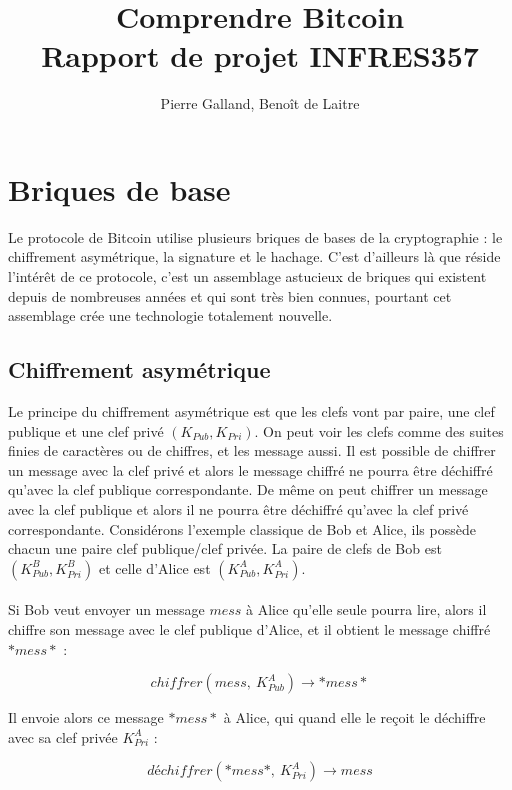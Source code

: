 \documentclass[11pt,a4paper]{article}
\title{Comprendre Bitcoin\\
Rapport de projet INFRES357
}
\author{Pierre Galland, Benoît de Laitre}
\begin{document}
\maketitle

\tableofcontents

\newpage

\section{Briques de base}

Le protocole de Bitcoin utilise plusieurs briques de bases de la cryptographie : le chiffrement asymétrique, la signature et le hachage. C'est d'ailleurs là que réside l'intérêt de ce protocole, c'est un assemblage astucieux de briques qui existent depuis de nombreuses années et qui sont très bien connues, pourtant cet assemblage crée une technologie totalement nouvelle.

\subsection{Chiffrement asymétrique}

Le principe du chiffrement asymétrique est que les clefs vont par paire, une clef publique et une clef privé $(K_{Pub}, K_{Pri})$. On peut voir les clefs comme des suites finies de caractères ou de chiffres, et les message aussi. Il est possible de chiffrer un message avec la clef privé et alors le message chiffré ne pourra être déchiffré qu'avec la clef publique correspondante. De même on peut chiffrer un message avec la clef publique et alors il ne pourra être déchiffré qu'avec la clef privé correspondante. Considérons l'exemple classique de Bob et Alice, ils possède chacun une paire clef publique/clef privée. La paire de clefs de Bob est 
$(K_{Pub}^{B}, K_{Pri}^{B})$ et celle d'Alice est $(K_{Pub}^{A}, K_{Pri}^{A})$.\\\\

Si Bob veut envoyer un message $mess$ à Alice qu'elle seule pourra lire, alors il chiffre son message avec le clef publique d'Alice, et il obtient le message chiffré $*mess*$ :

$$chiffrer(mess, ~K_{Pub}^{A}) \rightarrow *mess*$$

Il envoie alors ce message $*mess*$ à Alice, qui quand elle le reçoit le déchiffre avec sa clef privée $K_{Pri}^{A}$ :

$$déchiffrer(*mess*, ~K_{Pri}^{A}) \rightarrow mess$$
\end{document}
